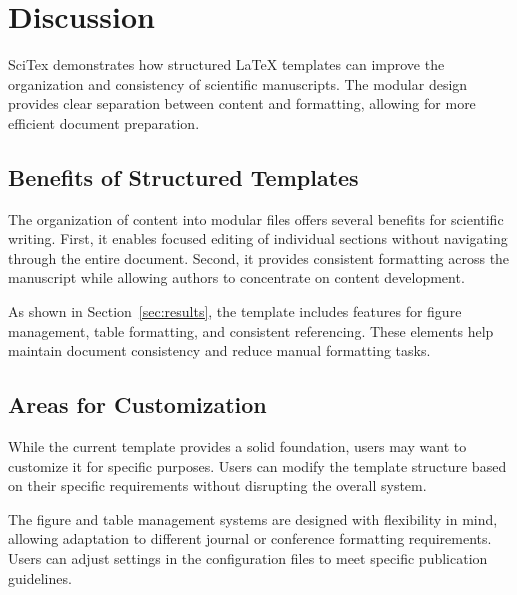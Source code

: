 
\section{Discussion}
\label{sec:discussion}


SciTex demonstrates how structured LaTeX templates can improve the organization and consistency of scientific manuscripts. The modular design provides clear separation between content and formatting, allowing for more efficient document preparation.


\subsection{Benefits of Structured Templates}
\label{subsec:benefits}

The organization of content into modular files offers several benefits for scientific writing. First, it enables focused editing of individual sections without navigating through the entire document. Second, it provides consistent formatting across the manuscript while allowing authors to concentrate on content development.

As shown in Section~\ref{sec:results}, the template includes features for figure management, table formatting, and consistent referencing. These elements help maintain document consistency and reduce manual formatting tasks.


\subsection{Areas for Customization}
\label{subsec:customization}

While the current template provides a solid foundation, users may want to customize it for specific purposes. Users can modify the template structure based on their specific requirements without disrupting the overall system.

The figure and table management systems are designed with flexibility in mind, allowing adaptation to different journal or conference formatting requirements. Users can adjust settings in the configuration files to meet specific publication guidelines.

